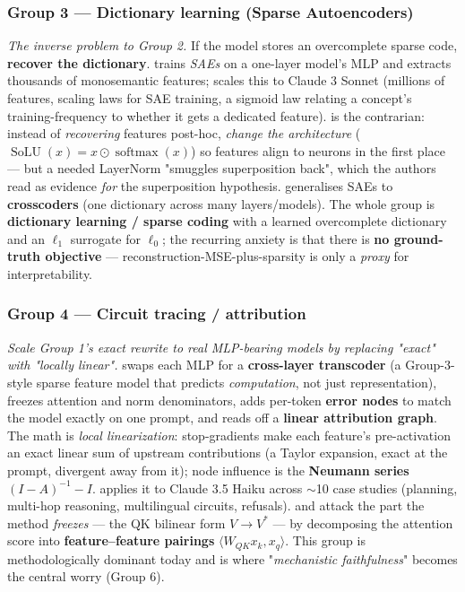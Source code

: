 \subsubsection*{Group 3 --- Dictionary learning (Sparse Autoencoders)}
\emph{The inverse problem to Group 2.} If the model stores an overcomplete sparse code, \textbf{recover the dictionary}. \textcite{towards-monosemanticity} trains \emph{SAEs} on a one-layer model's MLP and extracts thousands of monosemantic features; \textcite{scaling-monosemanticity} scales this to Claude 3 Sonnet (millions of features, scaling laws for SAE training, a sigmoid law relating a concept's training-frequency to whether it gets a dedicated feature). \textcite{softmax-linear-units} is the contrarian: instead of \emph{recovering} features post-hoc, \emph{change the architecture} ($\operatorname{SoLU}(x)=x\odot\operatorname{softmax}(x)$) so features align to neurons in the first place --- but a needed LayerNorm "smuggles superposition back", which the authors read as evidence \emph{for} the superposition hypothesis. \textcite{sparse-crosscoders-model-diffing} generalises SAEs to \textbf{crosscoders} (one dictionary across many layers/models). The whole group is \textbf{dictionary learning / sparse coding} with a learned overcomplete dictionary and an $\ell_1$ surrogate for $\ell_0$; the recurring anxiety is that there is \textbf{no ground-truth objective} --- reconstruction-MSE-plus-sparsity is only a \emph{proxy} for interpretability.


\subsubsection*{Group 4 --- Circuit tracing / attribution}
\emph{Scale Group 1's exact rewrite to real MLP-bearing models by replacing "exact" with "locally linear".} \textcite{circuit-tracing-computational-graphs} swaps each MLP for a \textbf{cross-layer transcoder} (a Group-3-style sparse feature model that predicts \emph{computation}, not just representation), freezes attention and norm denominators, adds per-token \textbf{error nodes} to match the model exactly on one prompt, and reads off a \textbf{linear attribution graph}. The math is \emph{local linearization}: stop-gradients make each feature's pre-activation an exact linear sum of upstream contributions (a Taylor expansion, exact at the prompt, divergent away from it); node influence is the \textbf{Neumann series} $(I-A)^{-1}-I$. \textcite{on-the-biology-of-a-large-language-model} applies it to Claude 3.5 Haiku across $\sim$10 case studies (planning, multi-hop reasoning, multilingual circuits, refusals). \textcite{tracing-attention-feature-interactions} and \textcite{progress-on-attention} attack the part the method \emph{freezes} --- the QK bilinear form $V\to V^{*}$ --- by decomposing the attention score into \textbf{feature--feature pairings} $\langle W_{QK}x_k, x_q\rangle$. This group is methodologically dominant today and is where "\emph{mechanistic faithfulness}" becomes the central worry (Group 6).


